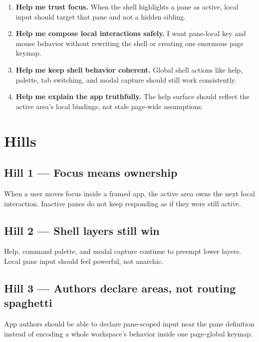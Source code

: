 \begin{enumerate}
\def\labelenumi{\arabic{enumi}.}
\item
  \textbf{Help me trust focus.} When the shell highlights a pane as active, local input should target that pane and not a hidden sibling.
\item
  \textbf{Help me compose local interactions safely.} I want pane-local key and mouse behavior without rewriting the shell or creating one enormous page keymap.
\item
  \textbf{Help me keep shell behavior coherent.} Global shell actions like help, palette, tab switching, and modal capture should still work consistently.
\item
  \textbf{Help me explain the app truthfully.} The help surface should reflect the active area's local bindings, not stale page-wide assumptions.
\end{enumerate}

\section{Hills}\label{record-044-hills}

\subsection{Hill 1 --- Focus means ownership}\label{record-044-hill-1-focus-means-ownership}

When a user moves focus inside a framed app, the active area owns the next local interaction. Inactive panes do not keep responding as if they were still active.

\subsection{Hill 2 --- Shell layers still win}\label{record-044-hill-2-shell-layers-still-win}

Help, command palette, and modal capture continue to preempt lower layers. Local pane input should feel powerful, not anarchic.

\subsection{Hill 3 --- Authors declare areas, not routing spaghetti}\label{record-044-hill-3-authors-declare-areas-not-routing-spaghetti}

App authors should be able to declare pane-scoped input near the pane definition instead of encoding a whole workspace's behavior inside one page-global keymap.

